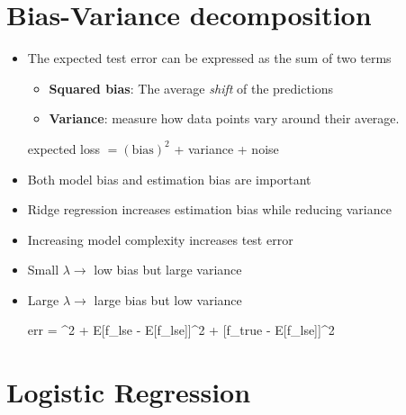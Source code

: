 \section{Bias-Variance decomposition}
\begin{itemize}
	\item The expected test error can be expressed as the sum of two terms
	\begin{itemize}
	 	\item \textbf{Squared bias}: The average \textit{shift} of the predictions 
	 	\item \textbf{Variance}: measure how data points vary around their average.
	 \end{itemize} 
	 \begin{center}
	 	expected loss $= (\text{bias})^2$ + variance + noise
	 \end{center}
	\item Both model bias and estimation bias are important
	\item Ridge regression increases estimation bias while reducing variance
	\item Increasing model complexity increases test error
	\item Small $\lambda \rightarrow$ low bias but large variance
	\item Large $\lambda \rightarrow$ large bias but low variance
	\begin{myalign*}
	    err = \sigma^2 + E[f_{lse} - E[f_{lse}]]^2 + [f_{true} - E[f_{lse}]]^2
	\end{myalign*}
\end{itemize}

\section{Logistic Regression}

